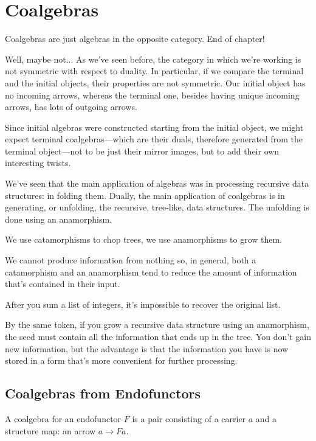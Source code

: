 \documentclass[DaoFP]{subfiles}
\begin{document}
\setcounter{chapter}{12}

\chapter{Coalgebras}

Coalgebras are just algebras in the opposite category. End of chapter!

Well, maybe not... As we've seen before, the category in which we're working is not symmetric with respect to duality. In particular, if we compare the terminal and the initial objects, their properties are not symmetric. Our initial object has no incoming arrows, whereas the terminal one, besides having unique incoming arrows, has lots of outgoing arrows. 

Since initial algebras were constructed starting from the initial object, we might expect terminal coalgebras---which are their duals, therefore generated from the terminal object---not to be just their mirror images, but to add their own interesting twists.

We've seen that the main application of algebras was in processing recursive data structures: in folding them. Dually, the main application of coalgebras is in generating, or unfolding, the recursive, tree-like, data structures. The unfolding is done using an anamorphism.

We use catamorphisms to chop trees, we use anamorphisms to grow them. 

We cannot produce information from nothing so, in general, both a catamorphism and an anamorphism tend to reduce the amount of information that's contained in their input. 

After you sum a list of integers, it's impossible to recover the original list. 

By the same token, if you grow a recursive data structure using an anamorphism, the seed must contain all the information that ends up in the tree. You don't gain new information, but the advantage is that the information you have is now stored in a form that's more convenient for further processing.

\section{Coalgebras from Endofunctors}

A coalgebra for an endofunctor $F$ is a pair consisting of a carrier $a$ and a structure map: an arrow $a \to F a$. 
\end{document}
